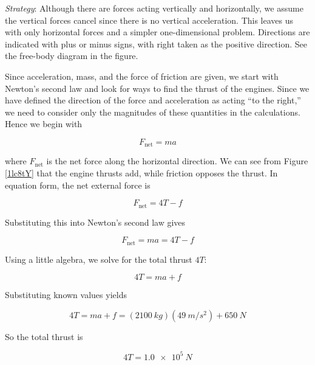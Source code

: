 \documentclass[main-ap-physics.tex]{subfiles}
\begin{document}
\Solution \textit{Strategy}: Although there are forces acting vertically and horizontally, we assume the vertical forces cancel since there is no vertical acceleration. This leaves us with only horizontal forces and a simpler one-dimensional problem. Directions are indicated with plus or minus signs, with right taken as the positive direction. See the free-body diagram in the figure.

\vspace{1em}

Since acceleration, mass, and the force of friction are given, we start with Newton's second law and look for ways to find the thrust of the engines. Since we have defined the direction of the force and acceleration as acting ``to the right,'' we need to consider only the magnitudes of these quantities in the calculations. Hence we begin with

\begin{equation*}
    F_{\text{net}} = m a
\end{equation*}

where $F_{\text{net}}$ is the net force along the horizontal direction. We can see from Figure \ref{1lc8tY} that the engine thrusts add, while friction opposes the thrust. In equation form, the net external force is

\begin{equation*}
    F_{\text{net}} = 4T - f
\end{equation*}

Substituting this into Newton's second law gives

\begin{equation*}
    F_{\text{net}} = ma = 4T - f
\end{equation*}

Using a little algebra, we solve for the total thrust $4T$:

\begin{equation*}
    4T = ma + f
\end{equation*}

Substituting known values yields

\begin{equation*}
    4 T = ma + f = \left(\SI{2100}{kg}\right) \left(\SI{49}{m/s^2}\right) + \SI{650}{N}
\end{equation*}

So the total thrust is

\begin{equation*}
    4T = \SI{1.0e5}{N}
\end{equation*}
\end{document}
